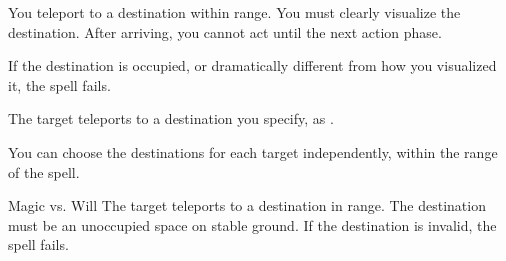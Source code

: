 \begin{spellheader}
    \spellrng{\rngext \rngunrestricted}
\end{spellheader}
\begin{spelleffects}
    \spelleffect You teleport to a destination within range. You must clearly visualize the destination. After arriving, you cannot act until the next action phase.

    If the destination is occupied, or dramatically different from how you visualized it, the spell fails.
\end{spelleffects}
\begin{spellfooter}

\end{spellfooter}

\begin{spellheader}
\end{spellheader}
\begin{spelleffects}
    \spelleffect The target teleports to a destination you specify, as .
\end{spelleffects}
\begin{spellfooter}
    \spellnotes You can choose the destinations for each target independently, within the range of the spell. 
\end{spellfooter}

\begin{spellheader}
    \spellrng{\rngmed}
\end{spellheader}
\begin{spelleffects}
    \begin{spellattack}{Magic vs. Will}
        \spelleffect The target teleports to a destination in range. The destination must be an unoccupied space on stable ground. If the destination is invalid, the spell fails.
    \end{spellattack}
\end{spelleffects}
\begin{spellfooter}

\end{spellfooter}

